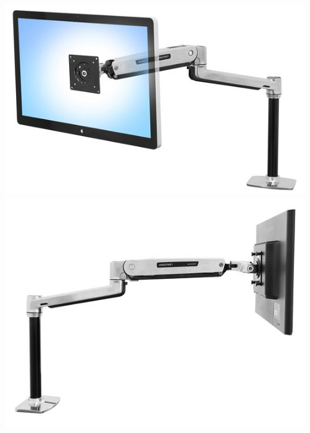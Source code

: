  \begin{minipage}{0.35\textwidth}
 	\includegraphics[width=\linewidth]{figuras/Imagenes_EstadoArte/LX_Sit-Stand_Desk_Arm.jpg}
 	\\

 	\includegraphics[width=\linewidth]{figuras/Imagenes_EstadoArte/LX_Sit-Stand_Desk_Arm_2.jpg}
 \end{minipage}
